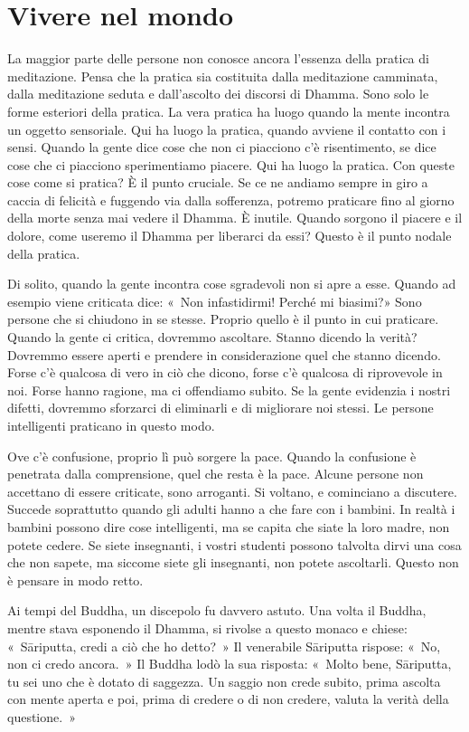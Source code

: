 \chapter{Vivere nel mondo}

La maggior parte delle persone non conosce ancora l'essenza della
pratica di meditazione. Pensa che la pratica sia costituita dalla
meditazione camminata, dalla meditazione seduta e dall'ascolto dei
discorsi di Dhamma. Sono solo le forme esteriori della pratica. La vera
pratica ha luogo quando la mente incontra un oggetto sensoriale. Qui ha
luogo la pratica, quando avviene il contatto con i sensi. Quando la
gente dice cose che non ci piacciono c'è risentimento, se dice cose che
ci piacciono sperimentiamo piacere. Qui ha luogo la pratica. Con queste
cose come si pratica? È il punto cruciale. Se ce ne andiamo sempre in
giro a caccia di felicità e fuggendo via dalla sofferenza, potremo
praticare fino al giorno della morte senza mai vedere il Dhamma. È
inutile. Quando sorgono il piacere e il dolore, come useremo il Dhamma
per liberarci da essi? Questo è il punto nodale della pratica.

Di solito, quando la gente incontra cose sgradevoli non si apre a esse.
Quando ad esempio viene criticata dice: «~Non infastidirmi! Perché mi
biasimi?» Sono persone che si chiudono in se stesse. Proprio quello è il
punto in cui praticare. Quando la gente ci critica, dovremmo ascoltare.
Stanno dicendo la verità? Dovremmo essere aperti e prendere in
considerazione quel che stanno dicendo. Forse c'è qualcosa di vero in
ciò che dicono, forse c'è qualcosa di riprovevole in noi. Forse hanno
ragione, ma ci offendiamo subito. Se la gente evidenzia i nostri
difetti, dovremmo sforzarci di eliminarli e di migliorare noi stessi. Le
persone intelligenti praticano in questo modo.

Ove c'è confusione, proprio lì può sorgere la pace. Quando la confusione
è penetrata dalla comprensione, quel che resta è la pace. Alcune persone
non accettano di essere criticate, sono arroganti. Si voltano, e
cominciano a discutere. Succede soprattutto quando gli adulti hanno a
che fare con i bambini. In realtà i bambini possono dire cose
intelligenti, ma se capita che siate la loro madre, non potete cedere.
Se siete insegnanti, i vostri studenti possono talvolta dirvi una cosa
che non sapete, ma siccome siete gli insegnanti, non potete ascoltarli.
Questo non è pensare in modo retto.

Ai tempi del Buddha, un discepolo fu davvero astuto. Una volta il
Buddha, mentre stava esponendo il Dhamma, si rivolse a questo monaco e
chiese: «~Sāriputta, credi a ciò che ho detto?~» Il venerabile Sāriputta
rispose: «~No, non ci credo ancora.~» Il Buddha lodò la sua risposta:
«~Molto bene, Sāriputta, tu sei uno che è dotato di saggezza. Un saggio
non crede subito, prima ascolta con mente aperta e poi, prima di credere
o di non credere, valuta la verità della questione.~»

